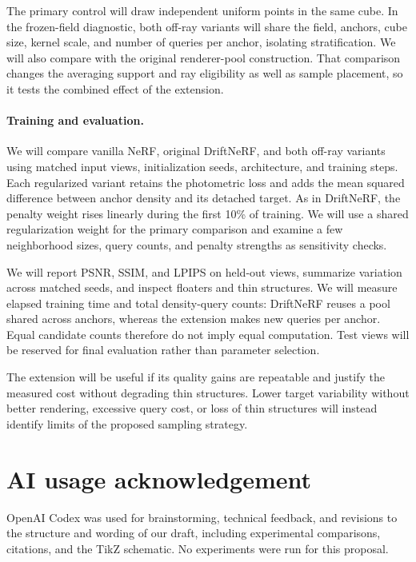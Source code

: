 \documentclass[sigconf,nonacm]{acmart}
\begin{document}
The primary control will draw independent uniform points in the same cube. In the frozen-field diagnostic, both off-ray variants will share the field, anchors, cube size, kernel scale, and number of queries per anchor, isolating stratification. We will also compare with the original renderer-pool construction. That comparison changes the averaging support and ray eligibility as well as sample placement, so it tests the combined effect of the extension.

\paragraph{Training and evaluation.}
We will compare vanilla NeRF, original DriftNeRF, and both off-ray variants using matched input views, initialization seeds, architecture, and training steps. Each regularized variant retains the photometric loss and adds the mean squared difference between anchor density and its detached target. As in DriftNeRF, the penalty weight rises linearly during the first 10\% of training. We will use a shared regularization weight for the primary comparison and examine a few neighborhood sizes, query counts, and penalty strengths as sensitivity checks.

We will report PSNR, SSIM, and LPIPS on held-out views, summarize variation across matched seeds, and inspect floaters and thin structures. We will measure elapsed training time and total density-query counts: DriftNeRF reuses a pool shared across anchors, whereas the extension makes new queries per anchor. Equal candidate counts therefore do not imply equal computation. Test views will be reserved for final evaluation rather than parameter selection.

The extension will be useful if its quality gains are repeatable and justify the measured cost without degrading thin structures. Lower target variability without better rendering, excessive query cost, or loss of thin structures will instead identify limits of the proposed sampling strategy.

\section*{AI usage acknowledgement}\label{sec:ai}
OpenAI Codex was used for brainstorming, technical feedback, and revisions to the structure and wording of our draft, including experimental comparisons, citations, and the TikZ schematic. No experiments were run for this proposal.



\end{document}
